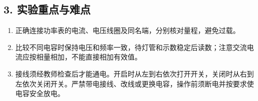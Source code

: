 \subsection*{3. 实验重点与难点}

\begin{enumerate}
\item 正确连接功率表的电流、电压线圈及同名端，分别核对量程，避免过载。
\item 比较不同电容时保持电压和频率一致，待灯管和示数稳定后读数；注意交流电流应按相量相加，不能直接相加有效值。
\item 接线须经教师检查后才能通电。开启时从左到右依次打开开关，关闭时从右到左依次关闭开关。严禁带电接线、改线或更换电容，操作前须断电并按要求使电容安全放电。


\end{enumerate}
